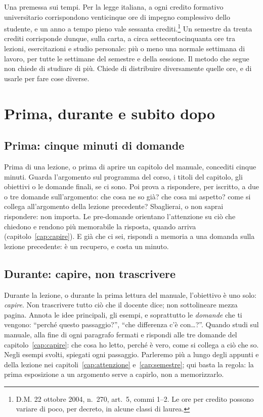 Una premessa sui tempi. Per la legge italiana, a ogni credito formativo
universitario corrispondono venticinque ore di impegno complessivo
dello studente, e un anno a tempo pieno vale sessanta
crediti.\footnote{D.M. 22 ottobre 2004, n.~270, art.~5, commi 1--2. Le
ore per credito possono variare di poco, per decreto, in alcune classi
di laurea.} Un semestre da trenta crediti corrisponde dunque, sulla
carta, a circa settecentocinquanta ore tra lezioni, esercitazioni e
studio personale: più o meno una normale settimana di lavoro, per tutte
le settimane del semestre e della sessione. Il metodo che segue non
chiede di studiare di più. Chiede di distribuire diversamente quelle
ore, e di usarle per fare cose diverse.

\section{Prima, durante e subito dopo}

\subsection*{Prima: cinque minuti di domande}

Prima di una lezione, o prima di aprire un capitolo del manuale,
concediti cinque minuti. Guarda l'argomento sul programma del corso, i
titoli del capitolo, gli obiettivi o le domande finali, se ci sono. Poi
prova a rispondere, per iscritto, a due o tre domande sull'argomento:
che cosa ne so già? che cosa mi aspetto? come si collega all'argomento
della lezione precedente? Sbaglierai, o non saprai rispondere: non
importa. Le pre-domande orientano l'attenzione su ciò che chiedono e
rendono più memorabile la risposta, quando arriva
(capitolo~\ref{cap:capire}). E già che ci sei, rispondi a memoria a una
domanda sulla lezione precedente: è un recupero, e costa un minuto.

\subsection*{Durante: capire, non trascrivere}

Durante la lezione, o durante la prima lettura del manuale, l'obiettivo
è uno solo: \emph{capire}. Non trascrivere tutto ciò che il docente
dice; non sottolineare mezza pagina. Annota le idee principali, gli
esempi, e soprattutto le \emph{domande} che ti vengono: \enquote{perché
questo passaggio?}, \enquote{che differenza c'è con\dots?}. Quando
studi sul manuale, alla fine di ogni paragrafo fermati e rispondi alle
tre domande del capitolo~\ref{cap:capire}: che cosa ho letto, perché è
vero, come si collega a ciò che so. Negli esempi svolti, spiegati ogni
passaggio. Parleremo più a lungo degli appunti e della lezione nei
capitoli~\ref{cap:attenzione} e~\ref{cap:semestre}; qui basta la regola:
la prima esposizione a un argomento serve a capirlo, non a
memorizzarlo.

